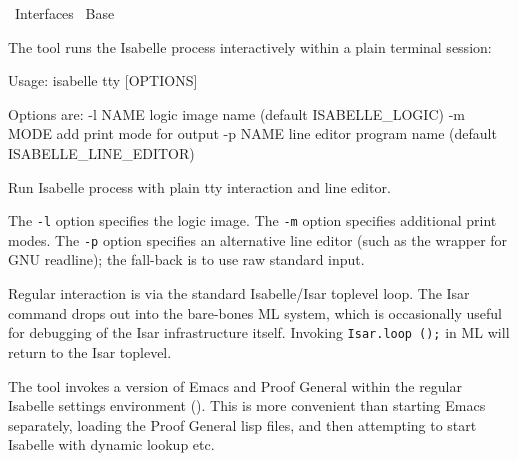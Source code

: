 %
\begin{isabellebody}%
\def\isabellecontext{Interfaces}%
%
\isadelimtheory
%
\endisadelimtheory
%
\isatagtheory
{}\isamarkupfalse%
\ Interfaces\isanewline
{}\ Base\isanewline
{}%
\endisatagtheory
{\isafoldtheory}%
%
\isadelimtheory
%
\endisadelimtheory
%
\isamarkuptrue%
%
\isamarkuptrue%
%
\begin{isamarkuptext}%
The \hypertarget{tool.tty}{\hyperlink{tool.tty}{\mbox{}}} tool runs the Isabelle process interactively
  within a plain terminal session:
\begin{ttbox}
Usage: isabelle tty [OPTIONS]

  Options are:
    -l NAME      logic image name (default ISABELLE_LOGIC)
    -m MODE      add print mode for output
    -p NAME      line editor program name (default ISABELLE_LINE_EDITOR)

  Run Isabelle process with plain tty interaction and line editor.
\end{ttbox}

  The \verb|-l| option specifies the logic image.  The
  \verb|-m| option specifies additional print modes.  The
  \verb|-p| option specifies an alternative line editor (such
  as the \hypertarget{executable.rlwrap}{\hyperlink{executable.rlwrap}{\mbox{}}} wrapper for GNU readline); the
  fall-back is to use raw standard input.

  Regular interaction is via the standard Isabelle/Isar toplevel loop.
  The Isar command \hyperlink{command.exit}{\mbox{}} drops out into the bare-bones ML
  system, which is occasionally useful for debugging of the Isar
  infrastructure itself.  Invoking \verb|Isar.loop|~\verb|();|
  in ML will return to the Isar toplevel.%
\end{isamarkuptext}%
\isamarkuptrue%
%
\isamarkuptrue%
%
\begin{isamarkuptext}%
The \hypertarget{tool.emacs}{\hyperlink{tool.emacs}{\mbox{}}} tool invokes a version of Emacs and
  Proof General \cite{proofgeneral} within the regular Isabelle
  settings environment ().  This is more
  convenient than starting Emacs separately, loading the Proof General
  lisp files, and then attempting to start Isabelle with dynamic
  \hyperlink{setting.PATH}{\mbox{}} lookup etc.


\end{isamarkuptext}
\end{isabellebody}
